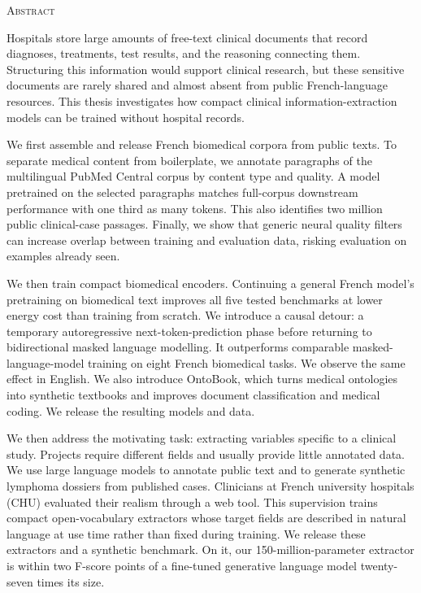\begin{center}
  \textsc{Abstract}
\end{center}
\noindent

Hospitals store large amounts of free-text clinical documents that record diagnoses, treatments, test results, and the reasoning connecting them. Structuring this information would support clinical research, but these sensitive documents are rarely shared and almost absent from public French-language resources. This thesis investigates how compact clinical information-extraction models can be trained without hospital records.

We first assemble and release French biomedical corpora from public texts. To separate medical content from boilerplate, we annotate paragraphs of the multilingual PubMed Central corpus by content type and quality. A model pretrained on the selected paragraphs matches full-corpus downstream performance with one third as many tokens. This also identifies two million public clinical-case passages. Finally, we show that generic neural quality filters can increase overlap between training and evaluation data, risking evaluation on examples already seen.

We then train compact biomedical encoders. Continuing a general French model's pretraining on biomedical text improves all five tested benchmarks at lower energy cost than training from scratch. We introduce a causal detour: a temporary autoregressive next-token-prediction phase before returning to bidirectional masked language modelling. It outperforms comparable masked-language-model training on eight French biomedical tasks. We observe the same effect in English. We also introduce OntoBook, which turns medical ontologies into synthetic textbooks and improves document classification and medical coding. We release the resulting models and data.

We then address the motivating task: extracting variables specific to a clinical study. Projects require different fields and usually provide little annotated data. We use large language models to annotate public text and to generate synthetic lymphoma dossiers from published cases. Clinicians at French university hospitals (CHU) evaluated their realism through a web tool. This supervision trains compact open-vocabulary extractors whose target fields are described in natural language at use time rather than fixed during training. We release these extractors and a synthetic benchmark. On it, our 150-million-parameter extractor is within two F-score points of a fine-tuned generative language model twenty-seven times its size.

